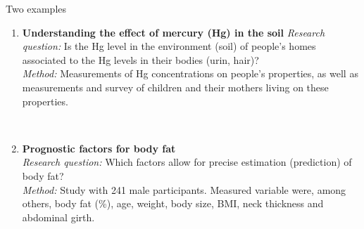 \documentclass[
  10pt,
  ignorenonframetext,
]{beamer}
\providecommand{\tightlist}{%
  \setlength{\itemsep}{0pt}\setlength{\parskip}{0pt}}
\begin{document}
\begin{frame}
\begin{block}{Two examples}
\protect\hypertarget{two-examples}{}
\(~\)

\begin{enumerate}
\tightlist
\item
  \textbf{Understanding the effect of mercury (Hg) in the soil}
  \emph{Research question:} Is the Hg level in the environment (soil) of
  people's homes associated to the Hg levels in their bodies (urin,
  hair)?\\
  \emph{Method:} Measurements of Hg concentrations on people's
  properties, as well as measurements and survey of children and their
  mothers living on these properties.
\end{enumerate}

\(~\)

\begin{enumerate}
\setcounter{enumi}{1}
\tightlist
\item
  \textbf{Prognostic factors for body fat}\\
  \emph{Research question:} Which factors allow for precise estimation
  (prediction) of body fat?\\
  \emph{Method:} Study with 241 male participants. Measured variable
  were, among others, body fat (\%), age, weight, body size, BMI, neck
  thickness and abdominal girth.
\end{enumerate}
\end{block}
\end{frame}
\end{document}
